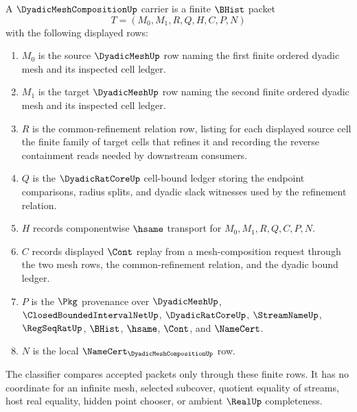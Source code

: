 \begin{definition}
\label{def:dyadic-mesh-composition-carrier}
A $\DyadicMeshCompositionUp$ carrier is a finite $\BHist$ packet
$$
T=(M_0,M_1,R,Q,H,C,P,N)
$$
with the following displayed rows:
\begin{enumerate}
\item $M_0$ is the source $\DyadicMeshUp$ row naming the first finite ordered dyadic mesh and its inspected cell ledger.
\item $M_1$ is the target $\DyadicMeshUp$ row naming the second finite ordered dyadic mesh and its inspected cell ledger.
\item $R$ is the common-refinement relation row, listing for each displayed source cell the finite family of target cells that refines it and recording the reverse containment reads needed by downstream consumers.
\item $Q$ is the $\DyadicRatCoreUp$ cell-bound ledger storing the endpoint comparisons, radius splits, and dyadic slack witnesses used by the refinement relation.
\item $H$ records componentwise $\hsame$ transport for $M_0,M_1,R,Q,C,P,N$.
\item $C$ records displayed $\Cont$ replay from a mesh-composition request through the two mesh rows, the common-refinement relation, and the dyadic bound ledger.
\item $P$ is the $\Pkg$ provenance over $\DyadicMeshUp$, $\ClosedBoundedIntervalNetUp$, $\DyadicRatCoreUp$, $\StreamNameUp$, $\RegSeqRatUp$, $\BHist$, $\hsame$, $\Cont$, and $\NameCert$.
\item $N$ is the local $\NameCert_{\DyadicMeshCompositionUp}$ row.
\end{enumerate}
The classifier compares accepted packets only through these finite rows. It has no coordinate for an infinite mesh, selected subcover, quotient equality of streams, host real equality, hidden point chooser, or ambient $\RealUp$ completeness.
\end{definition}

